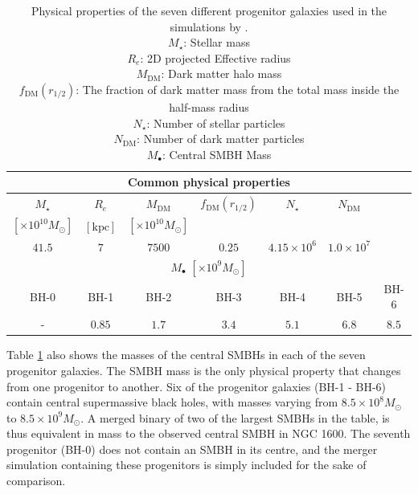 \documentclass[english, twoside]{HYgradu}
\begin{document}
\begin{table}
	\begin{center}
		\begin{tabular}{| c c c c c c c |}
		\hline
		\multicolumn{7}{|c|}{Common physical properties} \\
		\hline
		$M_\star$ & $R_e$ & $M_\mathrm{DM}$ & $f_\mathrm{DM}(r_{1/2})$ & $N_\star$ & $N_\mathrm{DM}$ & \\
		$[\times 10^{10} M_\odot]$ & $\mathrm{[kpc]}$ & $[\times 10^{10} M_\odot]$ & & & & \\
		$41.5$ & $7$ & $7500$ & $0.25$ & $4.15 \times 10^6$ & $1.0 \times 10^7$ & \\
		\hline
		\hline
		\multicolumn{7}{|c|}{$M_\bullet$ $[\times10^{9} M_\odot]$} \\
		\hline
		BH-0 & BH-1 & BH-2 & BH-3 & BH-4 & BH-5 & BH-6 \\
		- & $0.85$ & $1.7$ & $3.4$ & $5.1$ & $6.8$ & $8.5$ \\
		\hline
		\end{tabular}
	\end{center}
	\caption{Physical properties of the seven different progenitor galaxies used in the simulations by \cite{Rantala2018}. \\
	$M_\star$: Stellar mass \\
	$R_e$: 2D projected Effective radius \\
	$M_\mathrm{DM}$: Dark matter halo mass \\
	$f_\mathrm{DM}(r_{1/2})$: The fraction of dark matter mass from the total mass inside the half-mass radius \\
	$N_\star$: Number of stellar particles \\
	$N_\mathrm{DM}$: Number of dark matter particles \\
	$M_\bullet$: Central SMBH Mass}
	\label{table:properties}
\end{table}

Table \ref{table:properties} also shows the masses of the central SMBHs in each of the seven progenitor galaxies. The SMBH mass is the only physical property that changes from one progenitor to another. Six of the progenitor galaxies (BH-1 - BH-6) contain central supermassive black holes, with masses varying from $8.5 \times 10^8 M_\odot$ to $8.5 \times 10^9 M_\odot$. A merged binary of two of the largest SMBHs in the table, is thus equivalent in mass to the observed central SMBH in NGC 1600. The seventh progenitor (BH-0) does not contain an SMBH in its centre, and the merger simulation containing these progenitors is simply included for the sake of comparison.
\end{document}
